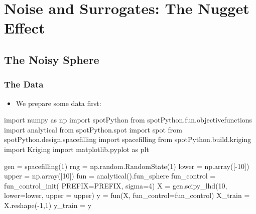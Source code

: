 \documentclass[
  letterpaper,
  DIV=11,
  numbers=noendperiod]{scrreprt}
\newenvironment{Shaded}{\begin{snugshade}}{\end{snugshade}}
\newcommand{\DecValTok}[1]{\textcolor[rgb]{0.68,0.00,0.00}{#1}}
\newcommand{\ImportTok}[1]{\textcolor[rgb]{0.00,0.46,0.62}{#1}}
\newcommand{\NormalTok}[1]{\textcolor[rgb]{0.00,0.23,0.31}{#1}}
\newcommand{\OperatorTok}[1]{\textcolor[rgb]{0.37,0.37,0.37}{#1}}
\providecommand{\tightlist}{%
  \setlength{\itemsep}{0pt}\setlength{\parskip}{0pt}}\usepackage{longtable,booktabs,array}
\begin{document}
\section{Noise and Surrogates: The Nugget
Effect}\label{noise-and-surrogates-the-nugget-effect}

\subsection{The Noisy Sphere}\label{the-noisy-sphere}

\subsubsection{The Data}\label{the-data}

\begin{itemize}
\tightlist
\item
  We prepare some data first:
\end{itemize}

\begin{Shaded}
\begin{Highlighting}[]
\ImportTok{import}\NormalTok{ numpy }\ImportTok{as}\NormalTok{ np}
\ImportTok{import}\NormalTok{ spotPython}
\ImportTok{from}\NormalTok{ spotPython.fun.objectivefunctions }\ImportTok{import}\NormalTok{ analytical}
\ImportTok{from}\NormalTok{ spotPython.spot }\ImportTok{import}\NormalTok{ spot}
\ImportTok{from}\NormalTok{ spotPython.design.spacefilling }\ImportTok{import}\NormalTok{ spacefilling}
\ImportTok{from}\NormalTok{ spotPython.build.kriging }\ImportTok{import}\NormalTok{ Kriging}
\ImportTok{import}\NormalTok{ matplotlib.pyplot }\ImportTok{as}\NormalTok{ plt}

\NormalTok{gen }\OperatorTok{=}\NormalTok{ spacefilling(}\DecValTok{1}\NormalTok{)}
\NormalTok{rng }\OperatorTok{=}\NormalTok{ np.random.RandomState(}\DecValTok{1}\NormalTok{)}
\NormalTok{lower }\OperatorTok{=}\NormalTok{ np.array([}\OperatorTok{{-}}\DecValTok{10}\NormalTok{])}
\NormalTok{upper }\OperatorTok{=}\NormalTok{ np.array([}\DecValTok{10}\NormalTok{])}
\NormalTok{fun }\OperatorTok{=}\NormalTok{ analytical().fun\_sphere}
\NormalTok{fun\_control }\OperatorTok{=}\NormalTok{ fun\_control\_init(}
\NormalTok{    PREFIX}\OperatorTok{=}\NormalTok{PREFIX,}
\NormalTok{    sigma}\OperatorTok{=}\DecValTok{4}\NormalTok{)}
\NormalTok{X }\OperatorTok{=}\NormalTok{ gen.scipy\_lhd(}\DecValTok{10}\NormalTok{, lower}\OperatorTok{=}\NormalTok{lower, upper }\OperatorTok{=}\NormalTok{ upper)}
\NormalTok{y }\OperatorTok{=}\NormalTok{ fun(X, fun\_control}\OperatorTok{=}\NormalTok{fun\_control)}
\NormalTok{X\_train }\OperatorTok{=}\NormalTok{ X.reshape(}\OperatorTok{{-}}\DecValTok{1}\NormalTok{,}\DecValTok{1}\NormalTok{)}
\NormalTok{y\_train }\OperatorTok{=}\NormalTok{ y}
\end{Highlighting}
\end{Shaded}
\end{document}

